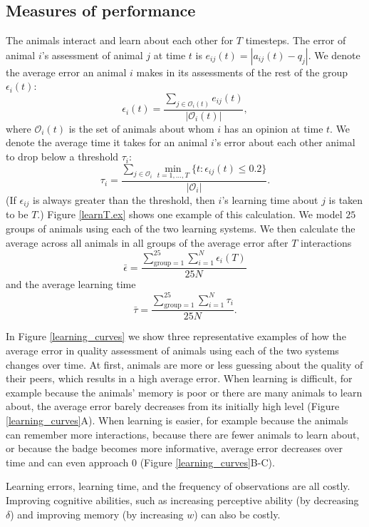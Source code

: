 \subsection{Measures of performance }
The animals interact and learn about each other for $T$ timesteps. The error of animal $i$'s assessment of animal $j$ at time $t$ is $e_{ij}(t)=|a_{ij}(t)-q_j|$. We denote the average error an animal $i$ makes in its assessments of the rest of the group $\epsilon_i(t)$: 
\begin{equation*}
\epsilon_i(t) = \frac{\sum_{j\in \mathscr{O}_i(t)}e_{ij}(t)}{|\mathscr{O}_i(t)|},
\end{equation*}
where $\mathscr{O}_i(t)$ is the set of animals about whom $i$ has an opinion at time $t$.  
We denote the average time it takes for an animal $i$'s error about each other animal to drop below a threshold $\tau_i$:
\begin{equation*}
\tau_{i} = \frac{\sum_{j\in\mathscr{O}_i} \min_{t=1,\dots,T}\{t: \epsilon_{ij}(t)\leq 0.2 \}}{|\mathscr{O}_i|} .
\end{equation*}
(If $\epsilon_{ij}$ is always greater than the threshold, then $i$'s learning time about $j$ is taken to be $T$.) Figure \ref{learnT.ex} shows one example of this calculation. We model $25$ groups of animals using each of the two learning systems. We then calculate the average across all animals in all groups  of the average error after $T$ interactions 
$$\bar{\epsilon}=\frac{\sum_{\text{group}=1}^{25}\sum_{i=1}^N\epsilon_i(T)}{25N}$$ and the average learning time $$\bar{\tau}=\frac{\sum_{\text{group}=1}^{25}\sum_{i=1}^N\tau_i}{25N}.$$

In Figure \ref{learning_curves} we show three representative examples of how the average error in quality assessment of animals using each of the two systems changes over time. At first, animals are more or less guessing about the quality of their peers, which results in a high average error. When learning is difficult, for example because the animals' memory is poor or there are many animals to learn about, the average error barely decreases from its initially high level (Figure \ref{learning_curves}A). When learning is easier, for example because the animals can remember more interactions, because there are fewer animals to learn about, or because the badge becomes more informative, average error decreases over time and can even approach $0$ (Figure \ref{learning_curves}B-C).  

Learning errors, learning time, and the frequency of observations are all costly. 
Improving  cognitive abilities, such as increasing perceptive ability (by decreasing $\delta$) and improving memory (by increasing $w$) can also be costly. 

